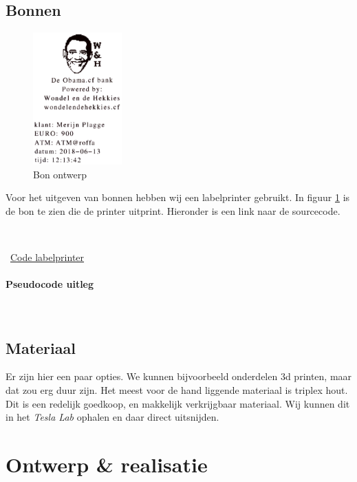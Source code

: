 \documentclass{article}
\begin{document}
\subsection{Bonnen}

\begin{figure}
        \centering
        \includegraphics[height=2.0in]{obama_bon.pdf}
       \caption{Bon ontwerp}
       \label{fig: Bon ontwerp}
\end{figure}

Voor het uitgeven van bonnen hebben wij een labelprinter gebruikt.
In figuur \ref{fig: Bon ontwerp} is de bon te zien die de printer uitprint.
Hieronder is een link naar de sourcecode.

\vspace{1mm}\

\Mundus~\href{https://github.com/Gewad/Project4Bankalicious/tree/master/bonnetjesPrinten}{Code labelprinter}

\paragraph{Pseudocode uitleg}\ 



\newpage

\subsection{Materiaal}

Er zijn hier een paar opties.
We kunnen bijvoorbeeld onderdelen 3d printen, maar dat zou erg duur zijn.
Het meest voor de hand liggende materiaal is triplex hout.
Dit is een redelijk goedkoop, en makkelijk verkrijgbaar materiaal.
Wij kunnen dit in het \emph{Tesla Lab} ophalen en daar direct uitsnijden.

\newpage

\section{Ontwerp \& realisatie}
\end{document}
